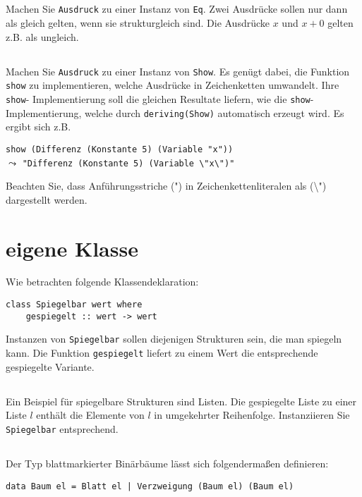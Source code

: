 \documentclass[
  10pt,                   %
  DIV12,
  german,                 %
  oneside,                %
  parskip=half,           %
  headings=normal,        %
  captions=tableheading,  %
]{scrartcl}
\begin{document}
\subsection{}
Machen Sie \lstinline|Ausdruck| zu einer Instanz von \lstinline|Eq|. Zwei Ausdrücke
sollen nur dann als gleich gelten, wenn sie strukturgleich sind. Die Ausdrücke
$x$ und $x + 0$ gelten z.B. als ungleich.
\subsection{}
Machen Sie \lstinline|Ausdruck| zu einer Instanz von \lstinline|Show|. Es genügt dabei, die Funktion \lstinline|show|
zu implementieren, welche Ausdrücke in Zeichenketten umwandelt. Ihre \lstinline|show|-
Implementierung soll die gleichen Resultate liefern, wie die \lstinline|show|-Implementierung,
welche durch \lstinline|deriving(Show)| automatisch erzeugt wird. Es ergibt sich z.B.
\begin{center}
\lstinline|show (Differenz (Konstante 5) (Variable "x"))|\\
$\leadsto$ \lstinline|"Differenz (Konstante 5) (Variable \"x\")"|
\end{center}
Beachten Sie, dass Anführungsstriche (") in Zeichenkettenliteralen als (\textbackslash") dargestellt
werden.
\section{eigene Klasse}
Wie betrachten folgende Klassendeklaration:
\begin{lstlisting}
class Spiegelbar wert where
	gespiegelt :: wert -> wert
\end{lstlisting}
Instanzen von \lstinline|Spiegelbar| sollen diejenigen Strukturen sein, die man spiegeln kann. Die
Funktion \lstinline|gespiegelt| liefert zu einem Wert die entsprechende gespiegelte Variante.
\subsection{}
Ein Beispiel für spiegelbare Strukturen sind Listen. Die gespiegelte Liste zu einer
Liste $l$ enthält die Elemente von $l$ in umgekehrter Reihenfolge. Instanziieren Sie
\lstinline|Spiegelbar| entsprechend.
\subsection{} 
Der Typ blattmarkierter Binärbäume lässt sich folgendermaßen definieren:
\begin{center}
\lstinline!data Baum el = Blatt el | Verzweigung (Baum el) (Baum el)!
\end{center}
\end{document}
